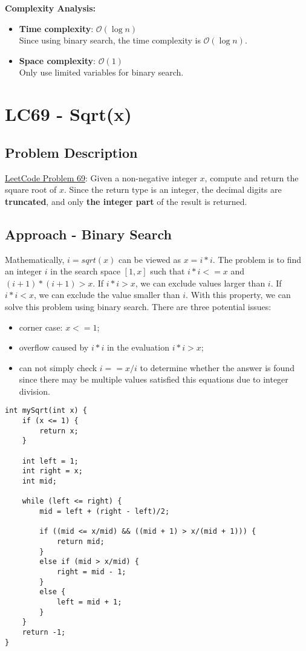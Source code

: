 \documentclass[justified]{tufte-book}
\begin{document}
\noindent \textbf{Complexity Analysis:}
\begin{itemize}
    \item \textbf{Time complexity}: $\mathcal{O}(\log n)$ \\
    Since using binary search, the time complexity is $\mathcal{O}(\log n)$.
    \item \textbf{Space complexity}: $\mathcal{O}(1)$ \\
    Only use limited variables for binary search.
\end{itemize}

\section{LC69 - Sqrt(x)} \label{sec:lc69_sqrt}
\subsection{Problem Description}
\href{https://leetcode.com/problems/sqrtx/}{LeetCode Problem 69}: Given a non-negative integer $x$, compute and return the square root of $x$.
Since the return type is an integer, the decimal digits are \textbf{truncated}, and only \textbf{the integer part} of the result is returned.

\subsection{Approach - Binary Search}
Mathematically, $i = sqrt(x)$ can be viewed as $x = i*i$. The problem is to find an integer $i$ in the search space $[1, x]$  such that $i*i <= x$ and $(i+1)*(i+1) > x$. If $i*i > x$, we can exclude values larger than $i$. If $i*i < x$, we can exclude the value smaller than $i$. With this property, we can solve this problem using binary search. There are three potential issues:
\begin{itemize}
    \item corner case: $x <= 1$;
    \item overflow caused by $i*i$ in the evaluation $i*i > x$;
    \item can not simply check $i == x/i$ to determine whether the answer is found since there may be multiple values satisfied this equations due to integer division.
\end{itemize}

\begin{lstlisting}
int mySqrt(int x) {
    if (x <= 1) {
        return x;
    }

    int left = 1;
    int right = x;
    int mid;

    while (left <= right) {
        mid = left + (right - left)/2;

        if ((mid <= x/mid) && ((mid + 1) > x/(mid + 1))) {
            return mid;
        }
        else if (mid > x/mid) {
            right = mid - 1;
        }
        else {
            left = mid + 1; 
        }
    }
    return -1;
}
\end{lstlisting}
\end{document}
